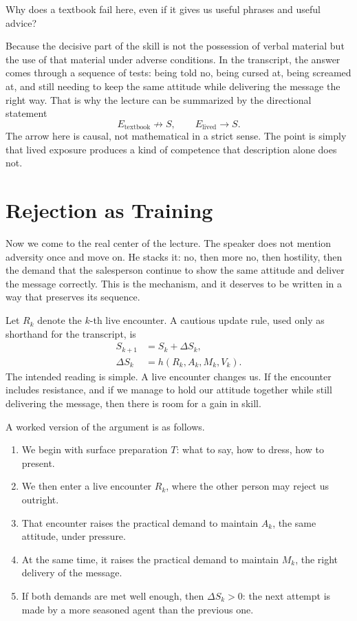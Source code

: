 Why does a textbook fail here, even if it gives us useful phrases and useful advice?

Because the decisive part of the skill is not the possession of verbal material but the use of that material under adverse conditions. In the transcript, the answer comes through a sequence of tests: being told no, being cursed at, being screamed at, and still needing to keep the same attitude while delivering the message the right way. That is why the lecture can be summarized by the directional statement
\begin{equation}
E_{\mathrm{textbook}} \not\to S,
\qquad
E_{\mathrm{lived}} \to S.
\end{equation}
The arrow here is causal, not mathematical in a strict sense. The point is simply that lived exposure produces a kind of competence that description alone does not.

\section{Rejection as Training}

Now we come to the real center of the lecture. The speaker does not mention adversity once and move on. He stacks it: no, then more no, then hostility, then the demand that the salesperson continue to show the same attitude and deliver the message correctly. This is the mechanism, and it deserves to be written in a way that preserves its sequence.

Let \(R_k\) denote the \(k\)-th live encounter. A cautious update rule, used only as shorthand for the transcript, is
\begin{align}
S_{k+1} &= S_k + \Delta S_k, \\
\Delta S_k &= h(R_k, A_k, M_k, V_k).
\end{align}
The intended reading is simple. A live encounter changes us. If the encounter includes resistance, and if we manage to hold our attitude together while still delivering the message, then there is room for a gain in skill.

A worked version of the argument is as follows.
\begin{enumerate}
\item We begin with surface preparation \(T\): what to say, how to dress, how to present.
\item We then enter a live encounter \(R_k\), where the other person may reject us outright.
\item That encounter raises the practical demand to maintain \(A_k\), the same attitude, under pressure.
\item At the same time, it raises the practical demand to maintain \(M_k\), the right delivery of the message.
\item If both demands are met well enough, then \(\Delta S_k > 0\): the next attempt is made by a more seasoned agent than the previous one.
\end{enumerate}

